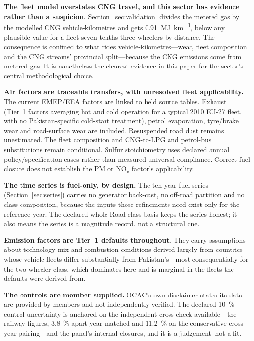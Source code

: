 \textbf{The fleet model overstates CNG travel, and this sector has evidence rather than a
suspicion.} Section~\ref{sec:validation} divides the metered gas by the modelled CNG
vehicle-kilometres and gets \SI{0.91}{\mega\joule\per\kilo\metre}, below any plausible
value for a fleet seven-tenths three-wheelers by distance. The consequence is confined to
what rides vehicle-kilometres---wear, fleet composition and the CNG streams' provincial
split---because the CNG emissions come from metered gas. It is nonetheless the clearest
evidence in this paper for the sector's central methodological choice.

\textbf{Air factors are traceable transfers, with unresolved fleet applicability.} The current EMEP/EEA factors are linked to held source tables. Exhaust (Tier~1 factors averaging hot and cold operation for a typical 2010 EU-27 fleet, with no Pakistan-specific cold-start treatment), petrol evaporation, tyre/brake wear and road-surface wear are included. Resuspended road dust remains unestimated. The fleet composition and CNG-to-LPG and petrol-bus substitutions remain conditional. Sulfur stoichiometry uses declared annual policy/specification cases rather than measured universal compliance. Correct fuel closure does not establish the PM or NO$_x$ factor's applicability.

\textbf{The time series is fuel-only, by design.} The ten-year fuel series
(Section~\ref{sec:series}) carries no generator back-cast, no off-road partition and no
class composition, because the inputs those refinements need exist only for the reference
year. The declared whole-Road-class basis keeps the series honest; it also means the
series is a magnitude record, not a structural one.

\textbf{Emission factors are Tier~1 defaults throughout.} They carry assumptions about
technology mix and combustion conditions derived largely from countries whose vehicle fleets
differ substantially from Pakistan's---most consequentially for the two-wheeler class, which
dominates here and is marginal in the fleets the defaults were derived from.

\textbf{The controls are member-supplied.} OCAC's own disclaimer states its data are
provided by members and not independently verified. The declared \SI{10}{\percent}
control uncertainty is anchored on the independent cross-check available---the railway
figures, \SI{3.8}{\percent} apart year-matched and \SI{11.2}{\percent} on the
conservative cross-year pairing---and the panel's internal closures, and it is a
judgement, not a fit.
